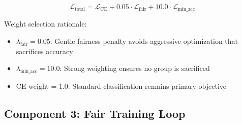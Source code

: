 \documentclass[11pt,a4paper,oneside]{report}
\begin{document}
\begin{equation}
\mathcal{L}_{\text{total}} = \mathcal{L}_{\text{CE}} + 0.05 \cdot \mathcal{L}_{\text{fair}} + 10.0 \cdot \mathcal{L}_{\text{min\_acc}}
\end{equation}

Weight selection rationale:

\begin{itemize}

\item $\lambda_{\text{fair}} = 0.05$: Gentle fairness penalty avoids aggressive optimization that sacrifices accuracy

\item $\lambda_{\text{min\_acc}} = 10.0$: Strong weighting ensures no group is sacrificed

\item CE weight = 1.0: Standard classification remains primary objective

\end{itemize}

\subsection{Component 3: Fair Training Loop}
\end{document}
